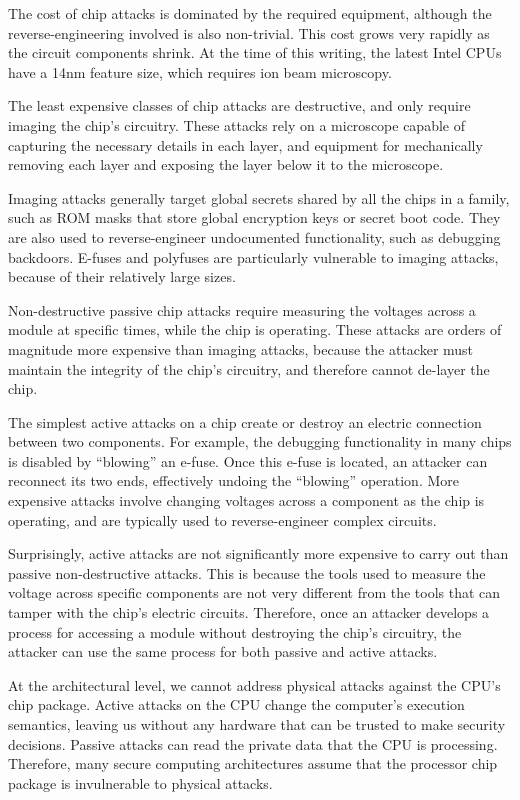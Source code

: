 The cost of chip attacks is dominated by the required equipment, although the
reverse-engineering involved is also non-trivial. This cost grows very rapidly
as the circuit components shrink. At the time of this writing, the latest Intel
CPUs have a 14nm feature size, which requires ion beam microscopy.

The least expensive classes of chip attacks are destructive, and only require
imaging the chip's circuitry. These attacks rely on a microscope capable of
capturing the necessary details in each layer, and equipment for mechanically
removing each layer and exposing the layer below it to the microscope.

Imaging attacks generally target global secrets shared by all the chips in a
family, such as ROM masks that store global encryption keys or secret boot
code. They are also used to reverse-engineer undocumented functionality, such
as debugging backdoors. E-fuses and polyfuses are particularly vulnerable to
imaging attacks, because of their relatively large sizes.

Non-destructive passive chip attacks require measuring the voltages across a
module at specific times, while the chip is operating. These attacks are orders
of magnitude more expensive than imaging attacks, because the attacker must
maintain the integrity of the chip's circuitry, and therefore cannot de-layer
the chip.

The simplest active attacks on a chip create or destroy an electric connection
between two components. For example, the debugging functionality in many chips
is disabled by ``blowing'' an e-fuse. Once this e-fuse is located, an attacker
can reconnect its two ends, effectively undoing the ``blowing'' operation. More
expensive attacks involve changing voltages across a component as the chip is
operating, and are typically used to reverse-engineer complex circuits.

Surprisingly, active attacks are not significantly more expensive to carry out
than passive non-destructive attacks. This is because the tools used to measure
the voltage across specific components are not very different from the tools
that can tamper with the chip's electric circuits. Therefore, once an attacker
develops a process for accessing a module without destroying the chip's
circuitry, the attacker can use the same process for both passive and active
attacks.

At the architectural level, we cannot address physical attacks against the
CPU's chip package. Active attacks on the CPU change the computer's execution
semantics, leaving us without any hardware that can be trusted to make security
decisions. Passive attacks can read the private data that the CPU is
processing. Therefore, many secure computing architectures assume that the
processor chip package is invulnerable to physical attacks.

